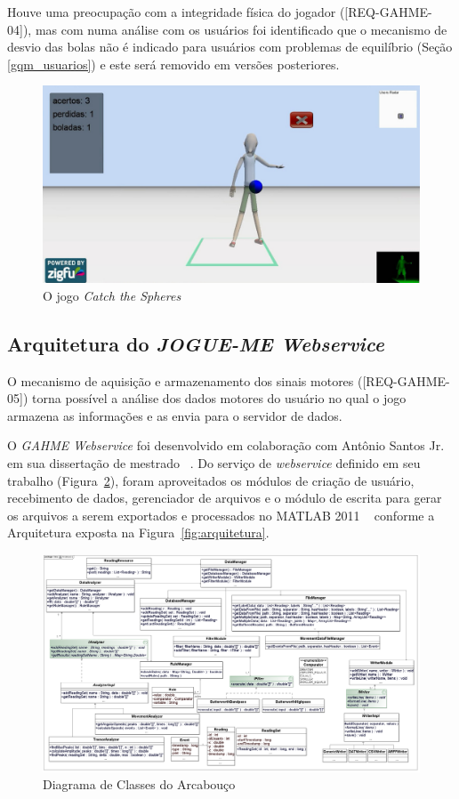 Houve uma preocupação com a integridade física do jogador ([REQ-GAHME-04]), mas com numa análise com os usuários foi identificado que o mecanismo de desvio das bolas não é indicado para usuários com problemas de equilíbrio (Seção \ref{gqm_usuarios}) e este será removido em versões posteriores.

\begin{figure}[!htb]
     \centering
     \includegraphics[width=.6\textwidth]{./img/catch-the-spheres.png}
     \caption{O jogo \emph{Catch the Spheres}}
     \label{img:catch}
\end{figure}

\subsection{Arquitetura do \textit{JOGUE-ME Webservice}}
O mecanismo de aquisição e armazenamento dos sinais motores ([REQ-GAHME-05]) torna possível a análise dos dados motores do usuário no qual o jogo armazena as informações e as envia para o servidor de dados. 

O \textit{GAHME Webservice} foi desenvolvido em colaboração com Antônio Santos Jr. em sua dissertação de mestrado ~\cite{antonio2013}. Do serviço de \textit{webservice} definido em seu trabalho (Figura~\ref{img:classd}), foram aproveitados os módulos de criação de usuário, recebimento de dados, gerenciador de arquivos e o módulo de escrita para gerar os arquivos a serem exportados e processados no MATLAB 2011 ~\cite{matlab2011} conforme a Arquitetura exposta na Figura~\ref{fig:arquitetura}.

\begin{figure}[!htb]
     \centering
     \includegraphics[width=1\textwidth]{./img/class_diagram.png}
     \caption[Diagrama de Classes do Arcabouço]{Diagrama de Classes do Arcabouço ~\cite{antonio2013}}
     \label{img:classd}
\end{figure}

